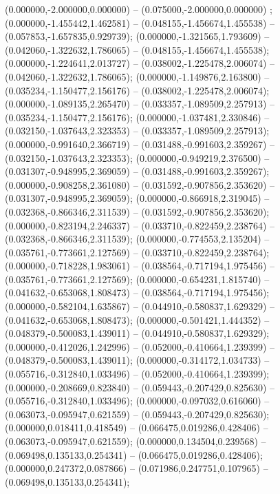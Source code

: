 (0.000000,-2.000000,0.000000) -- (0.075000,-2.000000,0.000000) ;
 (0.000000,-1.455442,1.462581) -- (0.048155,-1.456674,1.455538) -- (0.057853,-1.657835,0.929739);
 (0.000000,-1.321565,1.793609) -- (0.042060,-1.322632,1.786065) -- (0.048155,-1.456674,1.455538);
 (0.000000,-1.224641,2.013727) -- (0.038002,-1.225478,2.006074) -- (0.042060,-1.322632,1.786065);
 (0.000000,-1.149876,2.163800) -- (0.035234,-1.150477,2.156176) -- (0.038002,-1.225478,2.006074);
 (0.000000,-1.089135,2.265470) -- (0.033357,-1.089509,2.257913) -- (0.035234,-1.150477,2.156176);
 (0.000000,-1.037481,2.330846) -- (0.032150,-1.037643,2.323353) -- (0.033357,-1.089509,2.257913);
 (0.000000,-0.991640,2.366719) -- (0.031488,-0.991603,2.359267) -- (0.032150,-1.037643,2.323353);
 (0.000000,-0.949219,2.376500) -- (0.031307,-0.948995,2.369059) -- (0.031488,-0.991603,2.359267);
 (0.000000,-0.908258,2.361080) -- (0.031592,-0.907856,2.353620) -- (0.031307,-0.948995,2.369059);
 (0.000000,-0.866918,2.319045) -- (0.032368,-0.866346,2.311539) -- (0.031592,-0.907856,2.353620);
 (0.000000,-0.823194,2.246337) -- (0.033710,-0.822459,2.238764) -- (0.032368,-0.866346,2.311539);
 (0.000000,-0.774553,2.135204) -- (0.035761,-0.773661,2.127569) -- (0.033710,-0.822459,2.238764);
 (0.000000,-0.718228,1.983061) -- (0.038564,-0.717194,1.975456) -- (0.035761,-0.773661,2.127569);
 (0.000000,-0.654231,1.815740) -- (0.041632,-0.653068,1.808473) -- (0.038564,-0.717194,1.975456);
 (0.000000,-0.582104,1.635867) -- (0.044910,-0.580837,1.629329) -- (0.041632,-0.653068,1.808473);
 (0.000000,-0.501421,1.444352) -- (0.048379,-0.500083,1.439011) -- (0.044910,-0.580837,1.629329);
 (0.000000,-0.412026,1.242996) -- (0.052000,-0.410664,1.239399) -- (0.048379,-0.500083,1.439011);
 (0.000000,-0.314172,1.034733) -- (0.055716,-0.312840,1.033496) -- (0.052000,-0.410664,1.239399);
 (0.000000,-0.208669,0.823840) -- (0.059443,-0.207429,0.825630) -- (0.055716,-0.312840,1.033496);
 (0.000000,-0.097032,0.616060) -- (0.063073,-0.095947,0.621559) -- (0.059443,-0.207429,0.825630);
 (0.000000,0.018411,0.418549) -- (0.066475,0.019286,0.428406) -- (0.063073,-0.095947,0.621559);
 (0.000000,0.134504,0.239568) -- (0.069498,0.135133,0.254341) -- (0.066475,0.019286,0.428406);
 (0.000000,0.247372,0.087866) -- (0.071986,0.247751,0.107965) -- (0.069498,0.135133,0.254341);
